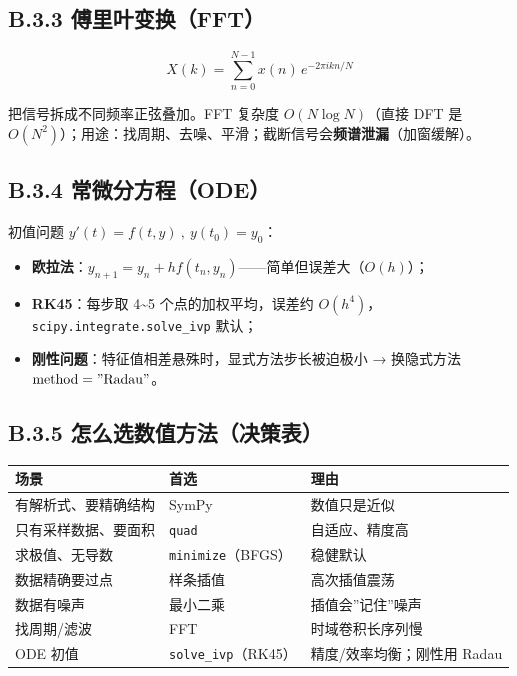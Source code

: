 \subsection{B.3.3
傅里叶变换（FFT）}\label{b.3.3-ux5085ux91ccux53f6ux53d8ux6362fft}

\[X(k)=\sum_{n=0}^{N-1}x(n)\,e^{-2\pi i kn/N}\]

把信号拆成不同频率正弦叠加。FFT 复杂度 \(O(N\log N)\)（直接 DFT 是
\(O(N^2)\)）；用途：找周期、去噪、平滑；截断信号会\textbf{频谱泄漏}（加窗缓解）。

\subsection{B.3.4
常微分方程（ODE）}\label{b.3.4-ux5e38ux5faeux5206ux65b9ux7a0bode}

初值问题 \(y'(t)=f(t,y)\ ,\ y(t_0)=y_0\)：

\begin{itemize}
\tightlist
\item
  \textbf{欧拉法}：\(y_{n+1}=y_n+h f(t_n,y_n)\)------简单但误差大（\(O(h)\)）；
\item
  \textbf{RK45}：每步取 4\textasciitilde5 个点的加权平均，误差约
  \(O(h^4)\)，\texttt{scipy.integrate.solve\_ivp} 默认；
\item
  \textbf{刚性问题}：特征值相差悬殊时，显式方法步长被迫极小 → 换隐式方法
  \(\mathrm{method="Radau"}\)。
\end{itemize}

\subsection{B.3.5
怎么选数值方法（决策表）}\label{b.3.5-ux600eux4e48ux9009ux6570ux503cux65b9ux6cd5ux51b3ux7b56ux8868}

{\def\LTcaptype{none} %
\begin{longtable}[]{@{}lll@{}}
\toprule\noalign{}
场景 & 首选 & 理由 \\
\midrule\noalign{}
\endhead
\bottomrule\noalign{}
\endlastfoot
有解析式、要精确结构 & SymPy & 数值只是近似 \\
只有采样数据、要面积 & \texttt{quad} & 自适应、精度高 \\
求极值、无导数 & \texttt{minimize}（BFGS） & 稳健默认 \\
数据精确要过点 & 样条插值 & 高次插值震荡 \\
数据有噪声 & 最小二乘 & 插值会''记住''噪声 \\
找周期/滤波 & FFT & 时域卷积长序列慢 \\
ODE 初值 & \texttt{solve\_ivp}（RK45） & 精度/效率均衡；刚性用 Radau \\
\end{longtable}
}


